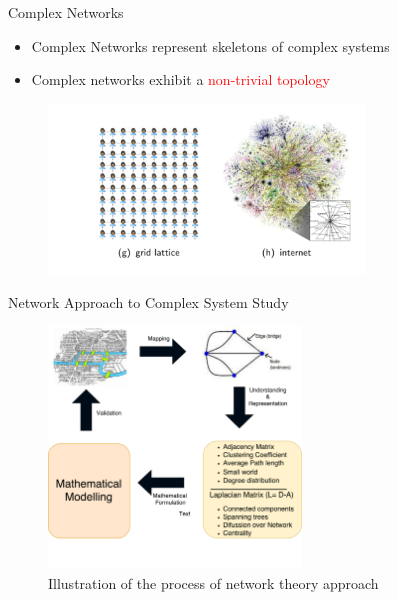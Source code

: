 \documentclass{beamer}
\begin{document}
\begin{frame}{Complex Networks}
	\begin{itemize}
		\item Complex Networks represent skeletons of complex systems
		\item Complex networks exhibit a \textcolor{red}{non-trivial topology}
	\end{itemize}
	\begin{figure}[!h]
		\centering
		\includegraphics[width=0.75\textwidth]{images/complex-nets.png}
	\end{figure}
\end{frame}




\begin{frame}{Network Approach to Complex System Study}
	
	\begin{figure}[!h]
		\centering
		\includegraphics[width=0.60\textwidth]{images/abstract-diagram.pdf}
		\caption{Illustration of the process of network theory approach}
	\end{figure}
	
\end{frame}
\end{document}
